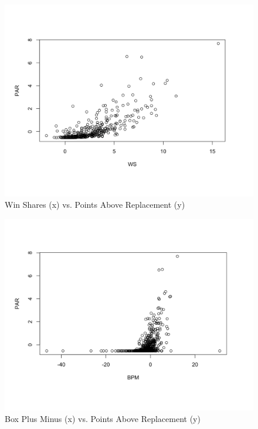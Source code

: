 \documentclass[12pt]{article}
\begin{document}
\begin{figure}[H]
  \centering
  \includegraphics[width=\textwidth]{WSvsPAR}
  \caption{Win Shares (x) vs. Points Above Replacement (y)}
  \label{fig:Fig2}
\end{figure}

\begin{figure}[H]
  \centering
  \includegraphics[width=\textwidth]{BPMvsPAR}
  \caption{Box Plus Minus (x) vs. Points Above Replacement (y)}
  \label{fig:Fig3}
\end{figure}
\end{document}
